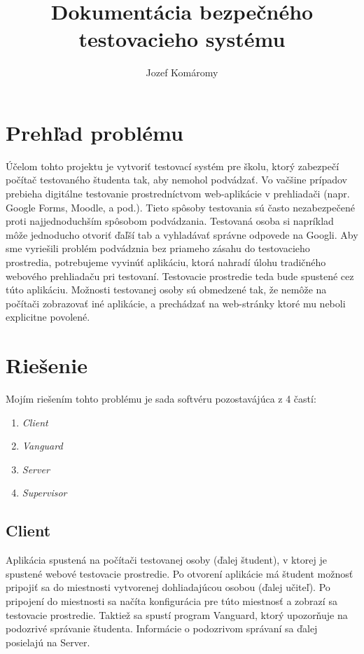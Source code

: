 \documentclass{article}
\begin{document}
\title{Dokumentácia bezpečného testovacieho systému}
\author{Jozef Komáromy}

\maketitle

\section{Prehľad problému}

Účelom tohto projektu je vytvoriť testovací systém pre školu, ktorý zabezpečí počítač testovaného študenta tak, aby nemohol podvádzať. Vo vačšine prípadov prebieha digitálne testovanie prostredníctvom web-aplikácie v prehliadači (napr. Google Forms, Moodle, a pod.). Tieto spôsoby testovania sú často nezabezpečené proti najjednoduchším spôsobom podvádzania. Testovaná osoba si napríklad môže jednoducho otvoriť ďaľší tab a vyhladávať správne odpovede na Googli. Aby sme vyriešili problém podvádznia bez priameho zásahu do testovacieho prostredia, potrebujeme vyvinúť aplikáciu, ktorá nahradí úlohu tradičného webového prehliadaču pri testovaní. Testovacie prostredie teda bude spustené cez túto aplikáciu. Možnosti testovanej osoby sú obmedzené tak, že nemôže na počítači zobrazovať iné aplikácie, a prechádzať na web-stránky ktoré mu neboli explicitne povolené.

\section{Riešenie}

Mojím riešením tohto problému je sada softvéru pozostavájúca z 4 častí:
\begin{enumerate}
  \item \emph{Client}
  \item \emph{Vanguard}
  \item \emph{Server}
  \item \emph{Supervisor}
\end{enumerate}

\subsection{Client}

Aplikácia spustená na počítači testovanej osoby (ďalej študent), v ktorej je spustené webové testovacie prostredie. Po otvorení aplikácie má študent možnosť pripojiť sa do miestnosti vytvorenej dohliadajúcou osobou (ďalej učiteľ). Po pripojení do miestnosti sa načíta konfigurácia pre túto miestnosť a zobrazí sa testovacie prostredie. Taktiež sa spustí program Vanguard, ktorý upozorňuje na podozrivé správanie študenta. Informácie o podozrivom správaní sa ďalej posielajú na Server.
\end{document}
